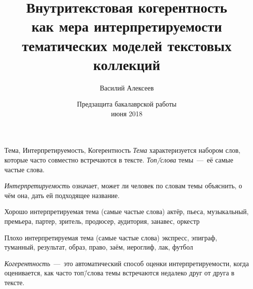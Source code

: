 \documentclass[sans, mathsans, russian]{beamer}
\title[Внутритекстовая когерентность]
{
  Внутритекстовая когерентность\\
  как мера интерпретируемости\\
  тематических моделей текстовых коллекций\\
}
\subtitle{}
\author[Василий Алексеев]{
  Василий Алексеев
}
\institute[]
{
  \footnotesize
}
\date[IS 2018]
{
  \footnotesize
  {
    Предзащита бакалаврской работы\\ \bigskip 13 июня 2018
  }
}
\begin{document}

		

  
\frame{\titlepage}


\begin{frame}{Тема, Интерпретируемость, Когерентность}
  \emph{Тема} характеризуется набором слов, которые часто совместно встречаются в тексте.
  \emph{Топ\=/слова} темы~---~её самые частые слова.
  
  \medskip
  
  \emph{Интерпретируемость} означает, может ли человек по словам темы объяснить, о чём она, дать ей подходящее название.
  
  \vspace{0.25cm}
  
  \begin{exampleblock}{Хорошо интерпретируемая тема (самые частые слова)}
    актёр, пьеса, музыкальный, премьера, партер, зритель, продюсер, аудитория, занавес, оркестр
  \end{exampleblock}
  
  \begin{alertblock}{Плохо интерпретируемая тема (самые частые слова)}
    экспресс, эпиграф, туманный, результат, образ, право, 
    заём, иероглиф, лак, футбол
  \end{alertblock}
  
  \smallskip
  
  \emph{Когерентность}~---~это автоматический способ оценки интерпретируемости, когда оценивается, как часто топ\=/слова темы встречаются недалеко друг от друга в тексте.
\end{frame}
\end{document}
